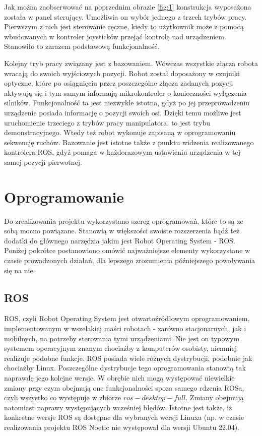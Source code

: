 Jak można zaobserwować na poprzednim obrazie \ref{fig:1} konstrukcja wyposażona została w panel sterujący. Umożliwia on wybór jednego z trzech trybów pracy. Pierwszym z nich jest sterowanie ręczne, kiedy to użytkownik może z pomocą wbudowanych w kontroler joysticków przejąć kontrolę nad urządzeniem. Stanowiło to zarazem podstawową funkcjonalność. 

Kolejny tryb pracy związany jest z bazowaniem. Wówczas wszystkie złącza robota wracają do swoich wyjściowych pozycji. Robot został doposażony w czujniki optyczne, które po osiągnięciu przez poszczególne złącza zadanych pozycji aktywują się i tym samym informują mikrokontroler o konieczności wyłączenia silników. Funkcjonalność ta jest niezwykle istotna, gdyż po jej przeprowadzeniu urządzenie posiada informację o pozycji swoich osi. Dzięki temu możliwe jest uruchomienie trzeciego z trybów pracy manipulatora, to jest trybu demonstracyjnego. Wtedy też robot wykonuje zapisaną w oprogramowaniu sekwencję ruchów. Bazowanie jest istotne także z punktu widzenia realizowanego kontrolera ROS, gdyż pomaga w każdorazowym ustawieniu urządzenia w tej samej pozycji pierwotnej.

\section{Oprogramowanie}
\label{sec:strukturaDokumentu}

Do zrealizowania projektu wykorzystano szereg oprogramowań, które to są ze sobą mocno powiązane. Stanowią w większości swoiste rozszerzenia bądź też dodatki do głównego narzędzia jakim jest Robot Operating System - ROS. Poniżej pokrótce postanowiono omówić najważniejsze elementy wykorzystane w czasie prowadzonych działań, dla lepszego zrozumienia późniejszego powoływania się na nie.


\subsection{ROS}
ROS, czyli Robot Operating System jest otwartoźródłowym oprogramowaniem, implementowanym w wszelakiej maści robotach - zarówno stacjonarnych, jak i mobilnych, na potrzeby sterowania tymi urządzeniami. Nie jest on typowym systemem operacyjnym znanym chociażby z komputerów osobisty, niemniej realizuje podobne funkcje. 
\cite{AW01}
\cite{OKa13}
ROS posiada wiele różnych dystrybucji, podobnie jak chociażby Linux. Poszczególne dystrybucje tego oprogramowania stanowią tak naprawdę jego kolejne wersje. W obrębie nich mogą występować niewielkie zmiany przy czym obejmują one funkcjonalności spoza samego rdzenia ROSa, czyli wszystko co występuje w zbiorze $ros-desktop-full$. Zmiany obejmują natomiast naprawy występujących wcześniej błędów. Istotne jest także, iż konkretne wersje ROS są dostępne dla wybranych wersji Linuxa (np. w czasie realizowania projektu ROS Noetic nie występował dla wersji Ubuntu 22.04).

